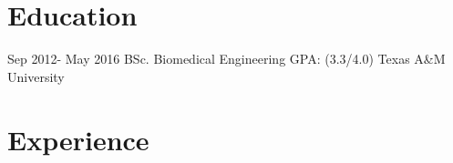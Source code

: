 \documentclass[letterpaper]{twentysecondcv} %
\begin{document}
\makeprofile %

\section{Education}

\begin{twenty} %
	\twentyitem
    	{Sep 2012-}
    	{May 2016}
        {BSc. Biomedical Engineering \textnormal{GPA: (3.3/4.0)}}
        {Texas A\&M University}
        {}
        {}
\end{twenty}


\section{Experience}
\end{document}
